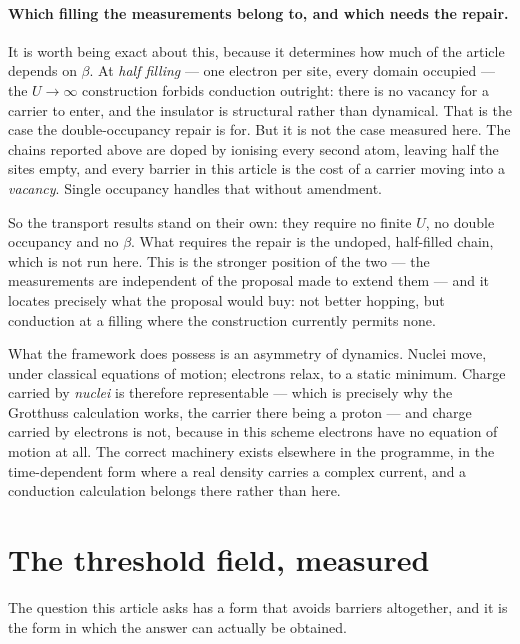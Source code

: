 \documentclass[11pt]{article}
\begin{document}
\paragraph{Which filling the measurements belong to, and which needs the repair.} It is worth being
exact about this, because it determines how much of the article depends on $\beta$. At \emph{half
filling} --- one electron per site, every domain occupied --- the $U\to\infty$ construction forbids
conduction outright: there is no vacancy for a carrier to enter, and the insulator is structural
rather than dynamical. That is the case the double-occupancy repair is for. But it is not the case
measured here. The chains reported above are doped by ionising every second atom, leaving half the
sites empty, and every barrier in this article is the cost of a carrier moving into a \emph{vacancy}.
Single occupancy handles that without amendment.

So the transport results stand on their own: they require no finite $U$, no double occupancy and no
$\beta$. What requires the repair is the undoped, half-filled chain, which is not run here. This is
the stronger position of the two --- the measurements are independent of the proposal made to extend
them --- and it locates precisely what the proposal would buy: not better hopping, but conduction at
a filling where the construction currently permits none.

What the framework does possess is an asymmetry of dynamics. Nuclei move, under classical equations
of motion; electrons relax, to a static minimum. Charge carried by \emph{nuclei} is therefore
representable --- which is precisely why the Grotthuss calculation works, the carrier there being a
proton --- and charge carried by electrons is not, because in this scheme electrons have no equation
of motion at all. The correct machinery exists elsewhere in the programme, in the time-dependent form
where a real density carries a complex current, and a conduction calculation belongs there rather
than here.

\section{The threshold field, measured}\label{sec:threshold}

The question this article asks has a form that avoids barriers altogether, and it is the form in
which the answer can actually be obtained.
\end{document}
